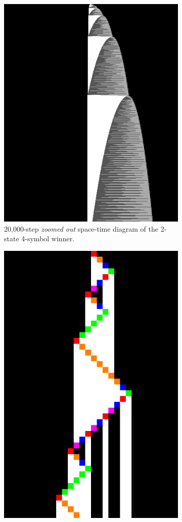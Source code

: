 \documentclass[a4paper,british]{article}
\theoremstyle{definition} %
\numberwithin{equation}{section}
\theoremstyle{definition} %
\begin{document}
\begin{figure}[h!]
\begin{subfigure}[t]{0.45\textwidth}
        \vspace{10pt} %
        \includegraphics[width=0.7\linewidth]{figures/space-time-diagrams/bb2x4_20k.png} %
        \caption{20,000-step \textit{zoomed out} space-time diagram of the 2-state 4-symbol winner.}\label{fig:bb2x4-diagram-zoomout}
    \end{subfigure}
    \hfill
    \begin{subfigure}[t]{0.45\textwidth}
        \centering
        \vspace{10pt} %
        \includegraphics[width=0.7\linewidth]{figures/space-time-diagrams/bb5.pdf}

\end{subfigure}
\end{figure}
\end{document}
